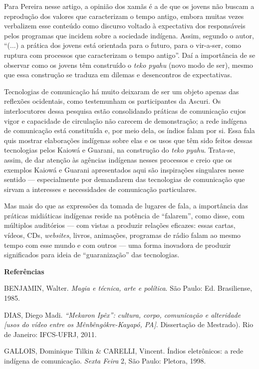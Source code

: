 Para Pereira nesse artigo, a opinião dos xamãs é a de que os jovens não
buscam a reprodução dos valores que caracterizam o tempo antigo, embora
muitas vezes verbalizem esse conteúdo como discurso voltado à
expectativa dos responsáveis pelos programas que incidem sobre a
sociedade indígena. Assim, segundo o autor, ``(...) a prática dos jovens
está orientada para o futuro, para o vir-a-ser, como ruptura com
processos que caracterizam o tempo antigo''. Daí a importância de se
observar como os jovens têm construído o \emph{teko pyahu} (novo modo de
ser), mesmo que essa construção se traduza em dilemas e desencontros de
expectativas.

Tecnologias de comunicação há muito deixaram de ser um objeto apenas das
reflexões ocidentais, como testemunham os participantes da Ascuri. Os
interlocutores dessa pesquisa estão consolidando práticas de comunicação
cujos vigor e capacidade de circulação não carecem de demonstração; a
rede indígena de comunicação está constituída e, por meio dela, os
índios falam por si. Essa fala quis mostrar elaborações indígenas sobre
elas e os usos que têm sido feitos dessas tecnologias pelos Kaiowá e
Guarani, na construção do \emph{teko pyahu}. Trata-se, assim, de dar
atenção às agências indígenas nesses processos e creio que os exemplos
Kaiowá e Guarani apresentados aqui são inspirações singulares nesse
sentido --- especialmente por demandarem das tecnologias de comunicação
que sirvam a interesses e necessidades de comunicação particulares.

Mas mais do que as expressões da tomada de lugares de fala, a
importância das práticas midiáticas indígenas reside na potência de
``falarem'', como disse, com múltiplos auditórios --- com vistas a
produzir relações eficazes: essas cartas, vídeos, CDs, \emph{websites},
livros, animações, programas de rádio falam ao mesmo tempo com esse
mundo e com outros --- uma forma inovadora de produzir significados para
ideia de ``guaranização'' das tecnologias.

\textbf{Referências }

BENJAMIN, Walter. \emph{Magia e técnica, arte e política}. São Paulo:
Ed. Brasiliense, 1985.

DIAS, Diego Madi. \emph{``Mekaron Ipêx'': cultura, corpo, comunicação e
alteridade {[}usos do vídeo entre os Mênbêngôkre-Kayapó, PA{]}}.
Dissertação de Mestrado). Rio de Janeiro: IFCS-UFRJ, 2011.

GALLOIS, Dominique Tilkin \& CARELLI, Vincent. Índios eletrônicos: a
rede indígena de comunicação. \emph{Sexta Feira} 2, São Paulo: Pletora,
1998.

